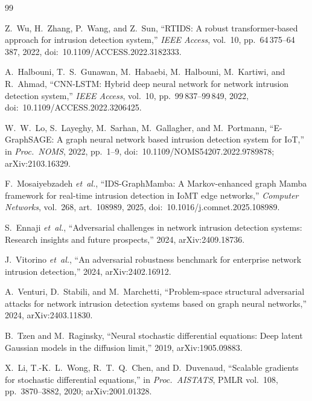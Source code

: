 \documentclass{ieeeaccess}
\begin{document}

\begin{thebibliography}{99}

 Z.~Wu, H.~Zhang, P.~Wang, and Z.~Sun,
``RTIDS: A robust transformer-based approach for intrusion detection
system,'' \emph{IEEE Access}, vol.~10, pp.~64\,375--64\,387, 2022,
doi:~10.1109/ACCESS.2022.3182333.

 A.~Halbouni, T.~S.~Gunawan, M.~Habaebi,
M.~Halbouni, M.~Kartiwi, and R.~Ahmad, ``CNN-LSTM: Hybrid deep
neural network for network intrusion detection system,''
\emph{IEEE Access}, vol.~10, pp.~99\,837--99\,849, 2022,
doi:~10.1109/ACCESS.2022.3206425.

 W.~W.~Lo, S.~Layeghy, M.~Sarhan, M.~Gallagher,
and M.~Portmann, ``E-GraphSAGE: A graph neural network based intrusion
detection system for IoT,'' in \emph{Proc.\ NOMS}, 2022, pp.~1--9,
doi:~10.1109/NOMS54207.2022.9789878; arXiv:2103.16329.

 F.~Mosaiyebzadeh \textit{et~al.},
``IDS-GraphMamba: A Markov-enhanced graph Mamba framework for
real-time intrusion detection in IoMT edge networks,''
\emph{Computer Networks}, vol.~268, art.~108989, 2025,
doi:~10.1016/j.comnet.2025.108989.

 S.~Ennaji \textit{et~al.}, ``Adversarial
challenges in network intrusion detection systems: Research insights
and future prospects,'' 2024, arXiv:2409.18736.

 J.~Vitorino \textit{et~al.}, ``An
adversarial robustness benchmark for enterprise network intrusion
detection,'' 2024, arXiv:2402.16912.

 A.~Venturi, D.~Stabili, and M.~Marchetti,
``Problem-space structural adversarial attacks for network intrusion
detection systems based on graph neural networks,'' 2024, arXiv:2403.11830.

 B.~Tzen and M.~Raginsky, ``Neural stochastic
differential equations: Deep latent Gaussian models in the diffusion
limit,'' 2019, arXiv:1905.09883.

 X.~Li, T.-K.~L.~Wong, R.~T.~Q.~Chen, and
D.~Duvenaud, ``Scalable gradients for stochastic differential
equations,'' in \emph{Proc.\ AISTATS}, PMLR vol.~108,
pp.~3870--3882, 2020; arXiv:2001.01328.


\end{thebibliography}
\end{document}
